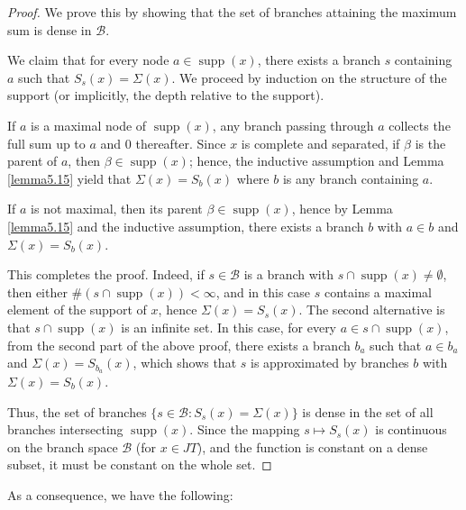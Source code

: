 \documentclass[11pt,a4paper]{amsart}
\newcommand{\JT}{JT}
\newcommand{\supp}{\operatorname{supp}}
\newcommand{\Branches}{\mathcal{B}}
\begin{document}
\begin{proof}
    We prove this by showing that the set of branches attaining the maximum sum is dense in $\Branches$.
    
    We claim that for every node $a \in \supp(x)$, there exists a branch $s$ containing $a$ such that $S_s(x) = \Sigma(x)$.
    We proceed by induction on the structure of the support (or implicitly, the depth relative to the support).
    
    If $a$ is a maximal node of $\supp(x)$, any branch passing through $a$ collects the full sum up to $a$ and 0 thereafter. Since $x$ is complete and separated, if $\beta$ is the parent of $a$, then $\beta \in \supp(x)$; hence, the inductive assumption and Lemma \ref{lemma5.15} yield that $\Sigma(x) = S_b(x)$ where $b$ is any branch containing $a$. 
 
    
    If $a$ is not maximal, then its parent $\beta \in \supp(x)$, hence by Lemma \ref{lemma5.15} and the inductive assumption, there exists a branch $b$ with $a\in b$ and $\Sigma(x) = S_b(x)$. 
    
    This completes the proof. Indeed, if 
    $s\in \Branches$ is a branch with $s \cap \supp(x) \ne \emptyset$, then either $\#(s\cap \supp(x)) < \infty$,
    and in this case $s$ contains a maximal element of the support of $x$, hence $\Sigma(x) = S_s(x)$. 
    The second alternative is that $s\cap \supp(x)$ is an infinite set. In this case, for every $a\in s\cap \supp(x)$, from the second part of the above proof, there exists a branch $b_a$ such that $a\in b_a$ and $\Sigma(x) = S_{b_a}(x)$, which shows that $s$ is approximated by branches $b$ with $\Sigma(x) = S_b(x)$. 
    
     
    
    Thus, the set of branches $\{ s \in \Branches : S_s(x) = \Sigma(x) \}$ is dense in the set of all branches intersecting $\supp(x)$. Since the mapping $s \mapsto S_s(x)$ is continuous on the branch space $\Branches$ (for $x \in \JT$), and the function is constant on a dense subset, it must be constant on the whole set.
\end{proof}

As a consequence, we have the following:
\end{document}
